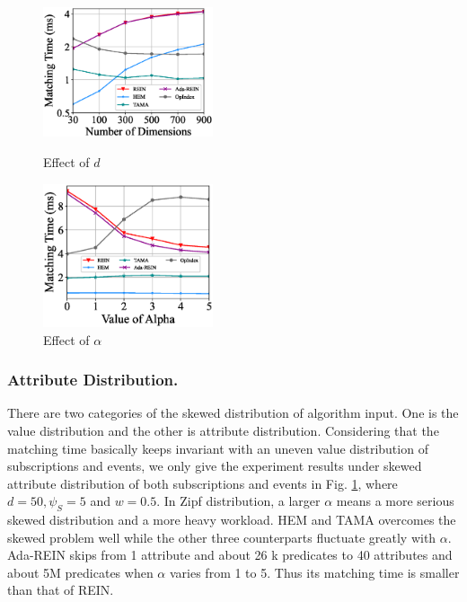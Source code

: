 \documentclass[runningheads]{llncs}
\begin{document}
\begin{figure}[tbp]
\centering
\begin{minipage}[t]{0.48\textwidth}
\centering
\includegraphics[width=5cm]{figures/exp7_d.eps}
\caption{Effect of $d$}
\label{exp7}
\end{minipage}
\quad
\begin{minipage}[t]{0.48\textwidth}
\centering
 \includegraphics[width=5cm]{figures/exp8_alpha.eps}
\caption{Effect of $\alpha$}
\label{exp8}
\end{minipage}
\end{figure}


\subsubsection{Attribute Distribution.}
There are two categories of the skewed distribution of algorithm input. One is the value distribution and the other is attribute distribution. Considering that the matching time basically keeps invariant with an uneven value distribution of subscriptions and events, we only give the experiment results under skewed attribute distribution of both subscriptions and events in Fig. \ref{exp8}, where $d=50, \psi_S=5$ and $w=0.5$. In Zipf distribution, a larger $\alpha$ means a more serious skewed distribution and a more heavy workload. HEM and TAMA overcomes the skewed problem well while the other three counterparts fluctuate greatly with $\alpha$. Ada-REIN skips from 1 attribute and about 26 k predicates to 40 attributes and about 5M predicates when $\alpha$ varies from 1 to 5. Thus its matching time is smaller than that of REIN. 
\end{document}
